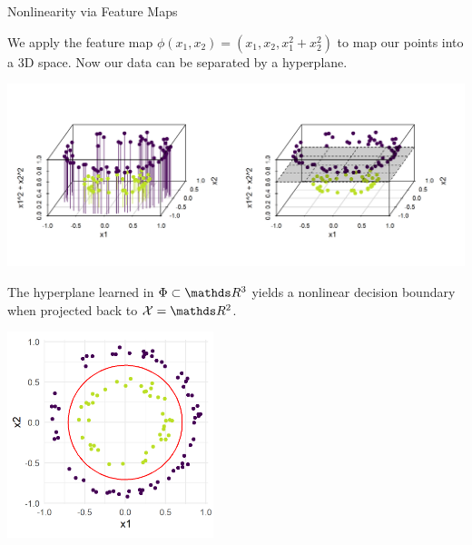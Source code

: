 \documentclass[11pt,compress,t,notes=noshow, xcolor=table]{beamer}
\begin{document}
\begin{vbframe}{Nonlinearity via Feature Maps}
\vspace*{0.5cm} 

We apply the feature map $\phi(x_1, x_2) = (x_1, x_2, x_1^2+x_2^2)$ to map our points into a 3D space. Now our data can be separated by a hyperplane.


\begin{center}
  \includegraphics{figure/circles_feature_map.png}
\end{center}

\framebreak 

The hyperplane learned in $\HS \subset \R^3$ yields a nonlinear decision boundary when projected back to $\Xspace  = \R^2$.

\begin{center}
\includegraphics[width=6cm]{figure/circles_boundary.png}
\end{center}

\end{vbframe}
\end{document}
